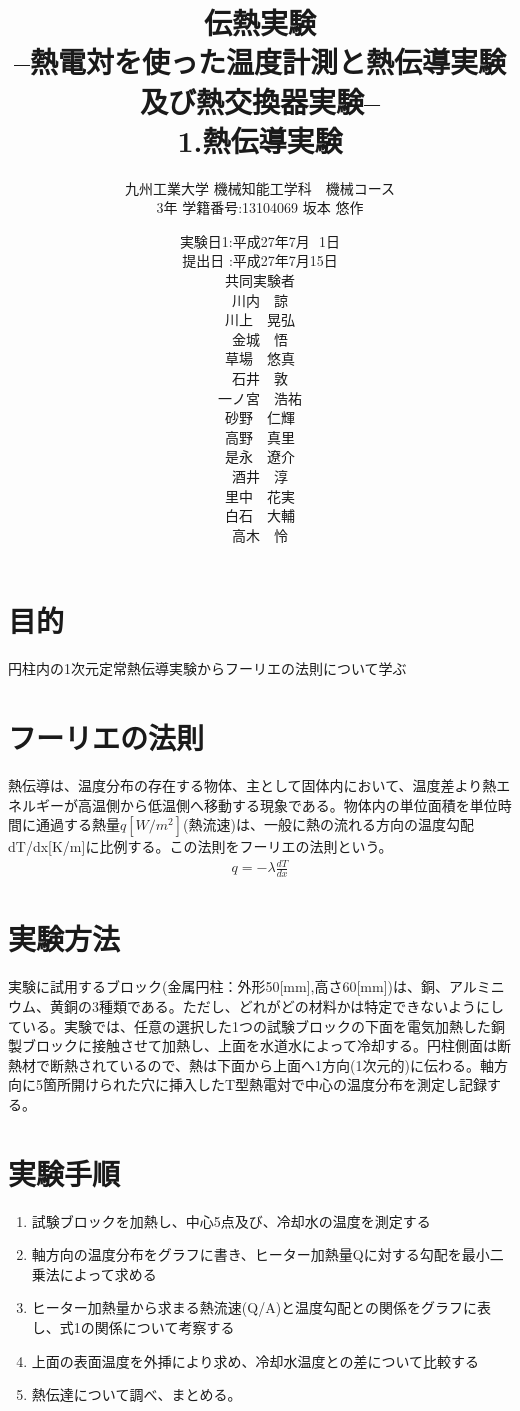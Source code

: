 \documentclass[a4j,twoside,openright,11pt]{jarticle}
\title{伝熱実験\\--熱電対を使った温度計測と熱伝導実験及び熱交換器実験--\\1.熱伝導実験}
\author{九州工業大学 機械知能工学科　機械コース\\3年 学籍番号:13104069 坂本 悠作}
\date{
実験日1:平成27年7月\,\,\,\,1日\\
提出日 :平成27年7月15日\\
共同実験者\\
川内　諒\\
川上　晃弘\\
金城　悟\\
草場　悠真\\
石井　敦\\
一ノ宮　浩祐\\
砂野　仁輝\\
高野　真里\\
是永　遼介\\
酒井　淳\\
里中　花実\\
白石　大輔\\
高木　怜\\
}
\begin{document}
\maketitle
\newpage

\section{目的}
円柱内の1次元定常熱伝導実験からフーリエの法則について学ぶ
\section{フーリエの法則}
熱伝導は、温度分布の存在する物体、主として固体内において、温度差より熱エネルギーが高温側から低温側へ移動する現象である。物体内の単位面積を単位時間に通過する熱量$q[W/m^2]$(熱流速)は、一般に熱の流れる方向の温度勾配dT/dx[K/m]に比例する。この法則をフーリエの法則という。
\begin{eqnarray}
q = -\lambda \frac{dT}{dx}
\end{eqnarray}


\section{実験方法}
実験に試用するブロック(金属円柱：外形50[mm],高さ60[mm])は、銅、アルミニウム、黄銅の3種類である。ただし、どれがどの材料かは特定できないようにしている。実験では、任意の選択した1つの試験ブロックの下面を電気加熱した銅製ブロックに接触させて加熱し、上面を水道水によって冷却する。円柱側面は断熱材で断熱されているので、熱は下面から上面へ1方向(1次元的)に伝わる。軸方向に5箇所開けられた穴に挿入したT型熱電対で中心の温度分布を測定し記録する。

\section{実験手順}
\begin{enumerate}
\item 試験ブロックを加熱し、中心5点及び、冷却水の温度を測定する
\item 軸方向の温度分布をグラフに書き、ヒーター加熱量Qに対する勾配を最小二乗法によって求める
\item ヒーター加熱量から求まる熱流速(Q/A)と温度勾配との関係をグラフに表し、式1の関係について考察する
\item 上面の表面温度を外挿により求め、冷却水温度との差について比較する
\item 熱伝達について調べ、まとめる。
\end{enumerate}
\end{document}
